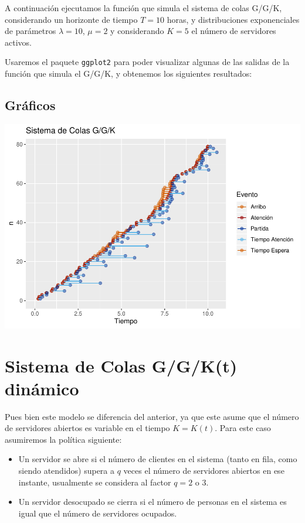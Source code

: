 \documentclass[]{article}
\providecommand{\tightlist}{%
  \setlength{\itemsep}{0pt}\setlength{\parskip}{0pt}}
\begin{document}
A continuación ejecutamos la función que simula el sistema de colas
G/G/K, considerando un horizonte de tiempo \(T=10\) horas, y
distribuciones exponenciales de parámetros \(\lambda=10\), \(\mu=2\) y
considerando \(K=5\) el número de servidores activos.

Usaremos el paquete \texttt{ggplot2} para poder visualizar algunas de
las salidas de la función que simula el G/G/K, y obtenemos los
siguientes resultados:

\subsection{Gráficos}\label{graficos}

\begin{flushright}\includegraphics{sistema_dinamico_files/figure-latex/unnamed-chunk-4-1} \end{flushright}

\clearpage

\section{Sistema de Colas G/G/K(t)
dinámico}\label{sistema-de-colas-ggkt-dinamico}

Pues bien este modelo se diferencia del anterior, ya que este asume que
el número de servidores abiertos es variable en el tiempo \(K=K(t)\).
Para este caso asumiremos la política siguiente:

\begin{itemize}
\tightlist
\item
  Un servidor se abre si el número de clientes en el sistema (tanto en
  fila, como siendo atendidos) supera a \(q\) veces el número de
  servidores abiertos en ese instante, usualmente se considera al factor
  \(q=2\) o \(3\).
\item
  Un servidor desocupado se cierra si el número de personas en el
  sistema es igual que el número de servidores ocupados.
\end{itemize}
\end{document}
